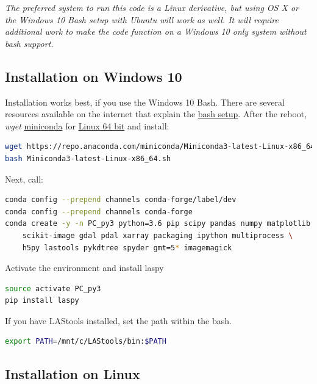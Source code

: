 \documentclass[a4paperpaper,,tablecaptionabove]{scrartcl}
\begin{document}
\emph{The preferred system to run this code is a Linux derivative, but
using OS X or the Windows 10 Bash setup with Ubuntu will work as well.
It will require additional work to make the code function on a Windows
10 only system without bash support.}

\hypertarget{installation-on-windows-10}{%
\subsection{Installation on Windows
10}\label{installation-on-windows-10}}

Installation works best, if you use the Windows 10 Bash. There are
several resources available on the internet that explain the
\href{https://www.windowscentral.com/how-install-bash-shell-command-line-windows-10}{bash
setup}. After the reboot, \emph{wget}
\href{https://conda.io/miniconda.html}{miniconda} for
\href{https://repo.anaconda.com/miniconda/Miniconda3-latest-Linux-x86_64.sh}{Linux
64 bit} and install:

\begin{lstlisting}[language=bash]
wget https://repo.anaconda.com/miniconda/Miniconda3-latest-Linux-x86_64.sh
bash Miniconda3-latest-Linux-x86_64.sh
\end{lstlisting}

Next, call:

\begin{lstlisting}[language=bash]
conda config --prepend channels conda-forge/label/dev
conda config --prepend channels conda-forge
conda create -y -n PC_py3 python=3.6 pip scipy pandas numpy matplotlib \
    scikit-image gdal pdal xarray packaging ipython multiprocess \
    h5py lastools pykdtree spyder gmt=5* imagemagick
\end{lstlisting}

Activate the environment and install laspy

\begin{lstlisting}[language=bash]
source activate PC_py3
pip install laspy
\end{lstlisting}

If you have LAStools installed, set the path within the bash.

\begin{lstlisting}[language=bash]
export PATH=/mnt/c/LAStools/bin:$PATH
\end{lstlisting}

\hypertarget{installation-on-linux}{%
\subsection{Installation on Linux}\label{installation-on-linux}}
\end{document}

